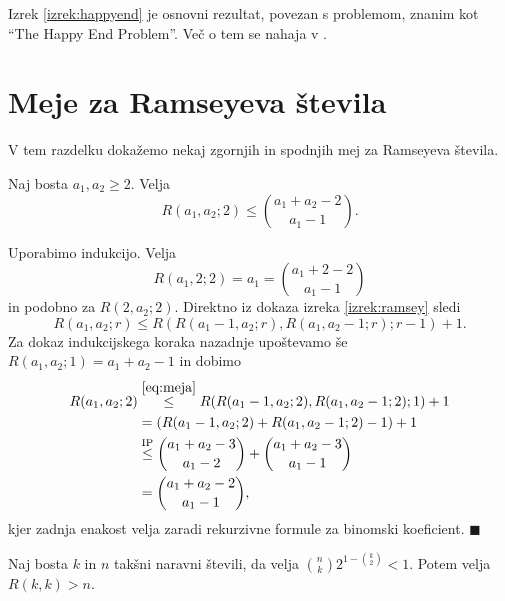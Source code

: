 \documentclass[twoside,11pt]{article}
\begin{document}
Izrek \ref{izrek:happyend} je osnovni rezultat, povezan s problemom, znanim 
kot ``The Happy End Problem''. Več o tem se nahaja v \cite[poglavje 29]{color}.

\section{Meje za Ramseyeva števila}

\hspace{\parindent}V tem razdelku dokažemo nekaj zgornjih in spodnjih mej za Ramseyeva števila.

\begin{trditev}
    Naj bosta $a_1,a_2 \ge 2$. Velja
    \[
        R(a_1, a_2; 2) \le \binom{a_1 + a_2 -2}{a_1-1}.
    \]
\end{trditev}

\begin{dokaz}
    Uporabimo indukcijo. Velja
    \[
        R(a_1, 2; 2) = a_1 = \binom{a_1+2-2}{a_1-1}
    \]
    in podobno za $R(2,a_2; 2)$. Direktno iz dokaza 
    izreka \ref{izrek:ramsey} sledi
    \begin{equation}
        R(a_1, a_2; r) \le R(R(a_1-1,a_2;r), R(a_1,a_2-1;r);r-1) + 1.
        \label{eq:meja}
    \end{equation}
    Za dokaz indukcijskega koraka nazadnje upoštevamo še $R(a_1,a_2;1) = a_1 + a_2 - 1$ in dobimo
    \begin{align*}
        R(a_1, a_2; 2) &\overset{\eqref{eq:meja}}{\le} R(R(a_1-1,a_2;2), R(a_1,a_2-1;2);1) +1\\
        &= (R(a_1-1,a_2;2) + R(a_1,a_2-1; 2) - 1) + 1 \\
        &\overset{{\text{IP}}}{\le} \binom{a_1 + a_2 -3}{a_1-2} + \binom{a_1 + a_2 -3}{a_1-1} \\
        &=\binom{a_1+a_2-2}{a_1-1},
    \end{align*}
    kjer zadnja enakost velja zaradi rekurzivne formule za binomski koeficient. \hfill $\blacksquare$
\end{dokaz} 

\begin{izrek}
    Naj bosta $k$ in $n$ takšni naravni števili, da velja 
    $\binom{n}{k}2^{1-\binom{k}{2}} < 1$. Potem velja 
    $R(k,k) > n$.
\end{izrek}
\end{document}
